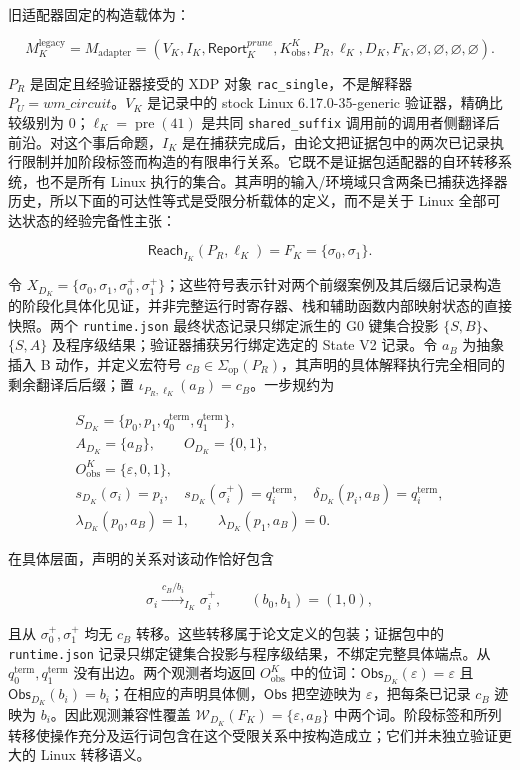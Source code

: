 \documentclass[
  11pt,
  a4paper,
]{ctexart}
\begin{document}
旧适配器固定的构造载体为：

\[M_K^{\mathrm{legacy}}=M_{\mathrm{adapter}}=(V_K,I_K,\mathsf{Report}^{\mathit{prune}}_K,K^K_{\mathrm{obs}},
P_R,\ell_K,D_K,F_K,\varnothing,\varnothing,\varnothing,\varnothing).\]

\(P_R\) 是固定且经验证器接受的 XDP 对象 \texttt{rac\_single}，不是解释器
\(P_U=\mathit{wm\_circuit}\)。\(V_K\) 是记录中的 stock Linux
6.17.0-35-generic 验证器，精确比较级别为
0；\(\ell_K=\operatorname{pre}(41)\) 是共同 \texttt{shared\_suffix}
调用前的调用者侧翻译后前沿。对这个事后命题，\(I_K\)
是在捕获完成后，由论文把证据包中的两次已记录执行限制并加阶段标签而构造的有限串行关系。它既不是证据包适配器的自环转移系统，也不是所有
Linux
执行的集合。其声明的输入/环境域只含两条已捕获选择器历史，所以下面的可达性等式是受限分析载体的定义，而不是关于
Linux 全部可达状态的经验完备性主张：

\[\mathsf{Reach}_{I_K}(P_R,\ell_K)=F_K=\{\sigma_0,\sigma_1\}.\]

令
\(X_{D_K}=\{\sigma_0,\sigma_1,\sigma_0^+,\sigma_1^+\}\)；这些符号表示针对两个前缀案例及其后缀后记录构造的阶段化具体化见证，并非完整运行时寄存器、栈和辅助函数内部映射状态的直接快照。两个
\texttt{runtime.json} 最终状态记录只绑定派生的 G0 键集合投影
\(\{S,B\}\)、\(\{S,A\}\) 及程序级结果；验证器捕获另行绑定选定的 State V2
记录。令 \(a_B\) 为抽象插入 B 动作，并定义宏符号
\(c_B\in\Sigma_{\mathrm{op}}(P_R)\)，其声明的具体解释执行完全相同的剩余翻译后后缀；置
\(\iota_{P_R,\ell_K}(a_B)=c_B\)。一步规约为

\[
\begin{gathered}
S_{D_K}=\{p_0,p_1,q^{\mathrm{term}}_0,q^{\mathrm{term}}_1\},\\
A_{D_K}=\{a_B\},\qquad O_{D_K}=\{0,1\},\\
O^K_{\mathrm{obs}}=\{\varepsilon,0,1\},\\
s_{D_K}(\sigma_i)=p_i,\quad s_{D_K}(\sigma_i^+)=q^{\mathrm{term}}_i,\quad
\delta_{D_K}(p_i,a_B)=q^{\mathrm{term}}_i,\\
\lambda_{D_K}(p_0,a_B)=1,\qquad \lambda_{D_K}(p_1,a_B)=0.
\end{gathered}
\]

在具体层面，声明的关系对该动作恰好包含

\[
\sigma_i\mathrel{\overset{c_B/b_i}{\longrightarrow}_{I_K}}\sigma_i^+,
\qquad (b_0,b_1)=(1,0),
\]

且从 \(\sigma_0^+,\sigma_1^+\) 均无 \(c_B\)
转移。这些转移属于论文定义的包装；证据包中的 \texttt{runtime.json}
记录只绑定键集合投影与程序级结果，不绑定完整具体端点。从
\(q^{\mathrm{term}}_0,q^{\mathrm{term}}_1\) 没有出边。两个观测者均返回
\(O^K_{\mathrm{obs}}\)
中的位词：\(\mathsf{Obs}_{D_K}(\varepsilon)=\varepsilon\) 且
\(\mathsf{Obs}_{D_K}(b_i)=b_i\)；在相应的声明具体侧，\(\mathsf{Obs}\)
把空迹映为 \(\varepsilon\)，把每条已记录 \(c_B\) 迹映为
\(b_i\)。因此观测兼容性覆盖
\(\mathcal W_{D_K}(F_K)=\{\varepsilon,a_B\}\)
中两个词。阶段标签和所列转移使操作充分及运行词包含在这个受限关系中按构造成立；它们并未独立验证更大的
Linux 转移语义。
\end{document}
